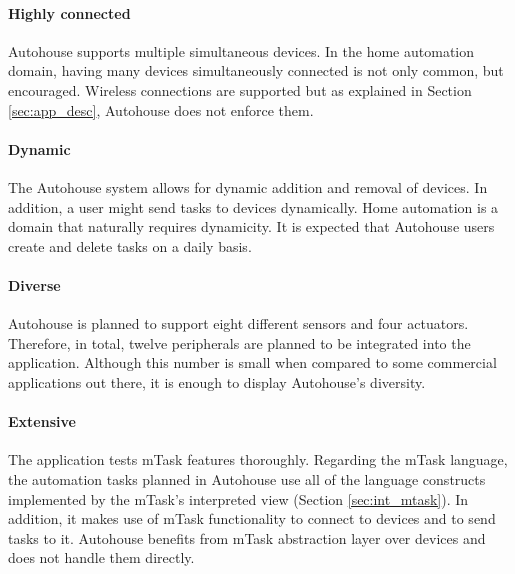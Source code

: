 \paragraph{Highly connected} Autohouse supports multiple simultaneous devices. In the home automation domain, having many devices simultaneously connected is not only common, but encouraged. Wireless connections are supported but as explained in Section \ref{sec:app_desc}, Autohouse does not enforce them. 

\paragraph{Dynamic} The Autohouse system allows for dynamic addition and removal of devices. In addition, a user might send tasks to devices dynamically. Home automation is a domain that naturally requires dynamicity. It is expected that Autohouse users create and delete tasks on a daily basis.

\paragraph{Diverse} Autohouse is planned to support eight different sensors and four actuators. Therefore, in total, twelve peripherals are planned to be integrated into the application. Although this number is small when compared to some commercial applications out there, it is enough to display Autohouse's diversity.

\paragraph{Extensive} The application tests \gls{mTask} features thoroughly. Regarding the \gls{mTask} language, the automation tasks planned in Autohouse use all of the language constructs implemented by the \gls{mTask}'s interpreted view (Section \ref{sec:int_mtask}). In addition, it makes use of \gls{mTask} functionality to connect to devices and to send tasks to it. Autohouse benefits from \gls{mTask} abstraction layer over devices and does not handle them directly.

